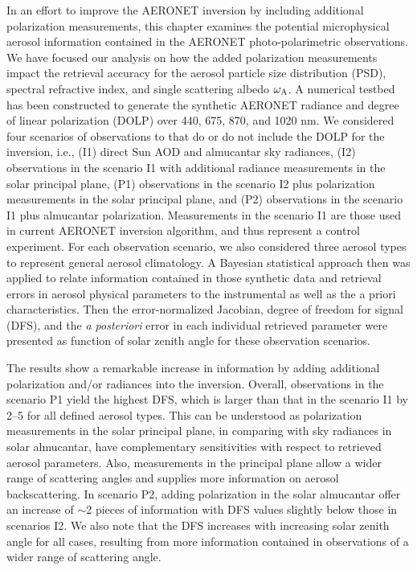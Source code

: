 In an effort to improve the AERONET inversion by including additional
polarization measurements, this chapter examines the potential
microphysical aerosol information contained in the AERONET
photo-polarimetric observations. We have focused our analysis on how the
added polarization measurements impact the retrieval accuracy for the
aerosol particle size distribution (PSD), spectral refractive index, and
single scattering albedo $\omega_\text{A}$. A numerical testbed has been constructed
to generate the synthetic AERONET radiance and degree of linear
polarization (DOLP) over 440, 675, 870, and 1020 nm. We considered four
scenarios of observations to that do or do not include the DOLP for the
inversion, i.e., (I1) direct Sun AOD and almucantar sky radiances, (I2)
observations in the scenario I1 with additional radiance measurements in
the solar principal plane, (P1) observations in the scenario I2 plus
polarization measurements in the solar principal plane, and (P2)
observations in the scenario I1 plus almucantar polarization.
Measurements in the scenario I1 are those used in current AERONET
inversion algorithm, and thus represent a control experiment. For each
observation scenario, we also considered three aerosol types to
represent general aerosol climatology. A Bayesian statistical
approach then was applied to relate information contained in those
synthetic data and retrieval errors in aerosol physical parameters to
the instrumental as well as the a priori characteristics. Then the
error-normalized Jacobian, degree of freedom for signal (DFS), and the
\textit{a posteriori} error in each individual retrieved parameter were 
presented as function of solar zenith angle for these observation scenarios. 

The results show a remarkable increase in information by adding
additional polarization and/or radiances into the inversion. Overall,
observations in the scenario P1 yield the highest DFS, which is larger
than that in the scenario I1 by 2--5 for all defined aerosol types. This
can be understood as polarization measurements in the solar principal
plane, in comparing with sky radiances in solar almucantar, have
complementary sensitivities with respect to retrieved aerosol
parameters. Also, measurements in the principal plane allow a wider
range of scattering angles and supplies more information on aerosol
backscattering. In scenario P2, adding polarization in the solar
almucantar offer an increase of $\sim$2 pieces of information with DFS values
slightly below those in scenarios I2. We also note that the DFS
increases with increasing solar zenith angle for all cases, resulting
from more information contained in observations of a wider range of
scattering angle.

